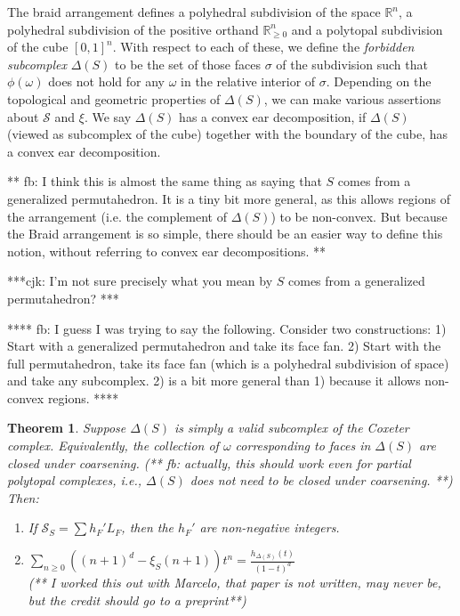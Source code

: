 \documentclass[12pt]{amsart}
\newtheorem{theorem}[definition]{Theorem}
\newcommand{\RR}{\mathbb{R}}
\newcommand{\SSS}{\mathcal{S}}
\begin{document}
The braid arrangement defines a polyhedral subdivision of the space $\RR^n$, a polyhedral subdivision of the positive orthand $\RR_{\geq 0}^n$ and a polytopal subdivision of the cube $[0,1]^n$. With respect to each of these, we define the \emph{forbidden subcomplex} $\Delta(S)$ to be the set of those faces $\sigma$ of the subdivision such that $\phi(\omega)$ does not hold for any $\omega$ in the relative interior of $\sigma$. Depending on the topological and geometric properties of $\Delta(S)$, we can make various assertions about $\SSS$ and $\xi$. We say $\Delta(S)$ has a convex ear decomposition, if $\Delta(S)$ (viewed as subcomplex of the cube) together with the boundary of the cube, has a convex ear decomposition.

** fb: I think this is almost the same thing as saying that $S$ comes from a generalized permutahedron. It is a tiny bit more general, as this allows regions of the arrangement (i.e. the complement of $\Delta(S)$) to be non-convex. But because the Braid arrangement is so simple, there should be an easier way to define this notion, without referring to convex ear decompositions. **

***cjk: I'm not sure precisely what you mean by $S$ comes from a generalized permutahedron? ***

**** fb: I guess I was trying to say the following. Consider two constructions: 1) Start with a generalized permutahedron and take its face fan. 2) Start with the full permutahedron, take its face fan (which is a polyhedral subdivision of space) and take any subcomplex. 2) is a bit more general than 1) because it allows non-convex regions. ****

\begin{theorem}
Suppose $\Delta(S)$ is simply a valid subcomplex of the Coxeter complex.  Equivalently, the collection of $\omega$ 
corresponding to faces in $\Delta(S)$ are closed under coarsening. (** fb: actually, this should work even for partial polytopal complexes, i.e., $\Delta(S)$ does not need to be closed under coarsening. **) Then:
\begin{enumerate}
\item If $\SSS_S = \sum h_F' L_F$, then the $h_F'$ are non-negative integers.
\item $ \sum_{n \geq 0} ((n+1)^d - \xi_S(n+1)) t^n = \frac{h_{\Delta(S)}(t)}{(1-t)^d} $ \\
(** I worked this out with Marcelo, that paper is not written, may never be, but the credit should go to a preprint**) 
\end{enumerate}
\end{theorem}
\end{document}
